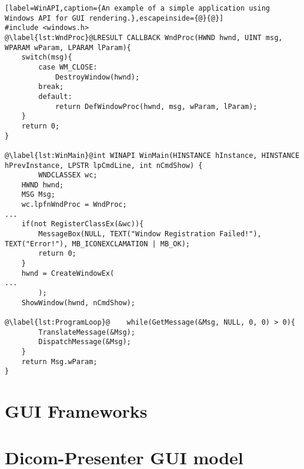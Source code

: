 \begin{lstlisting}[label=WinAPI,caption={An example of a simple application using Windows API for GUI rendering.},escapeinside={@}{@}]
#include <windows.h>
@\label{lst:WndProc}@LRESULT CALLBACK WndProc(HWND hwnd, UINT msg, WPARAM wParam, LPARAM lParam){
    switch(msg){
        case WM_CLOSE:
            DestroyWindow(hwnd);
        break;
        default:
            return DefWindowProc(hwnd, msg, wParam, lParam);
    }
    return 0;
}

@\label{lst:WinMain}@int WINAPI WinMain(HINSTANCE hInstance, HINSTANCE hPrevInstance, LPSTR lpCmdLine, int nCmdShow) {
		WNDCLASSEX wc;
    HWND hwnd;
    MSG Msg;
    wc.lpfnWndProc = WndProc;    
...
    if(not RegisterClassEx(&wc)){
        MessageBox(NULL, TEXT("Window Registration Failed!"), TEXT("Error!"), MB_ICONEXCLAMATION | MB_OK);
        return 0;
    }
    hwnd = CreateWindowEx(
...
		);
    ShowWindow(hwnd, nCmdShow);

@\label{lst:ProgramLoop}@    while(GetMessage(&Msg, NULL, 0, 0) > 0){
        TranslateMessage(&Msg);
        DispatchMessage(&Msg);
    }
    return Msg.wParam;
}
\end{lstlisting}

\section{GUI Frameworks}




\section{Dicom-Presenter GUI model}

